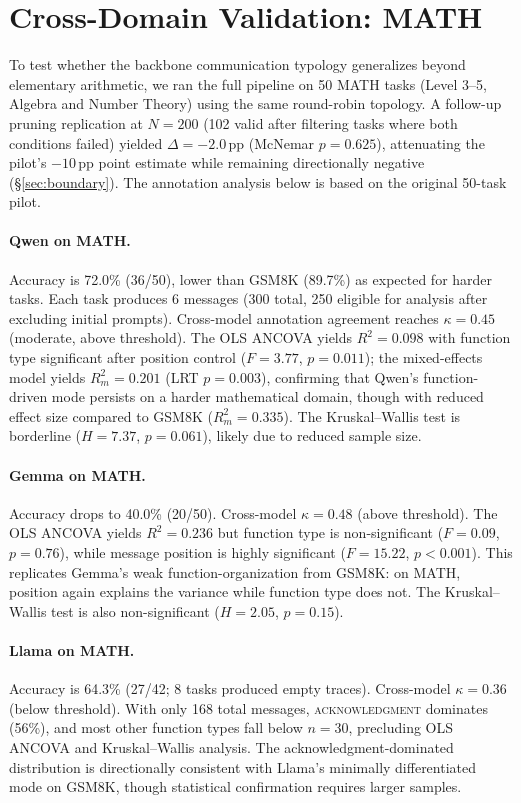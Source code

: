 \section{Cross-Domain Validation: MATH}
\label{app:math}

To test whether the backbone communication typology generalizes beyond elementary arithmetic, we ran the full pipeline on 50 MATH tasks (Level 3--5, Algebra and Number Theory) using the same round-robin topology. A follow-up pruning replication at $N{=}200$ (102 valid after filtering tasks where both conditions failed) yielded $\Delta = -2.0$\,pp (McNemar $p = 0.625$), attenuating the pilot's $-10$\,pp point estimate while remaining directionally negative (\S\ref{sec:boundary}). The annotation analysis below is based on the original 50-task pilot.

\paragraph{Qwen on MATH.} Accuracy is 72.0\% (36/50), lower than GSM8K (89.7\%) as expected for harder tasks. Each task produces 6 messages (300 total, 250 eligible for analysis after excluding initial prompts). Cross-model annotation agreement reaches $\kappa = 0.45$ (moderate, above threshold). The OLS ANCOVA yields $R^2 = 0.098$ with function type significant after position control ($F = 3.77$, $p = 0.011$); the mixed-effects model yields $R^2_m = 0.201$ (LRT $p = 0.003$), confirming that Qwen's function-driven mode persists on a harder mathematical domain, though with reduced effect size compared to GSM8K ($R^2_m = 0.335$). The Kruskal--Wallis test is borderline ($H = 7.37$, $p = 0.061$), likely due to reduced sample size.

\paragraph{Gemma on MATH.} Accuracy drops to 40.0\% (20/50). Cross-model $\kappa = 0.48$ (above threshold). The OLS ANCOVA yields $R^2 = 0.236$ but function type is non-significant ($F = 0.09$, $p = 0.76$), while message position is highly significant ($F = 15.22$, $p < 0.001$). This replicates Gemma's weak function-organization from GSM8K: on MATH, position again explains the variance while function type does not. The Kruskal--Wallis test is also non-significant ($H = 2.05$, $p = 0.15$).

\paragraph{Llama on MATH.} Accuracy is 64.3\% (27/42; 8 tasks produced empty traces). Cross-model $\kappa = 0.36$ (below threshold). With only 168 total messages, \textsc{acknowledgment} dominates (56\%), and most other function types fall below $n = 30$, precluding OLS ANCOVA and Kruskal--Wallis analysis. The acknowledgment-dominated distribution is directionally consistent with Llama's minimally differentiated mode on GSM8K, though statistical confirmation requires larger samples.

